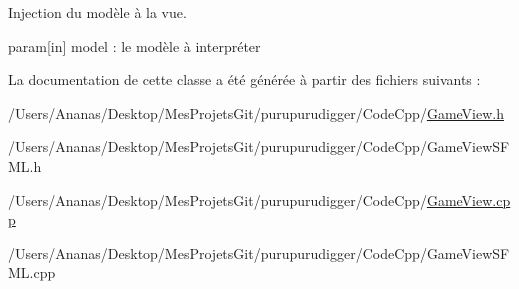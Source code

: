 Injection du modèle à la vue. 

param\mbox{[}in\mbox{]} model \-: le modèle à interpréter 

La documentation de cette classe a été générée à partir des fichiers suivants \-:\begin{DoxyCompactItemize}
\item 
/\-Users/\-Ananas/\-Desktop/\-Mes\-Projets\-Git/purupurudigger/\-Code\-Cpp/\hyperlink{_game_view_8h}{Game\-View.\-h}\item 
/\-Users/\-Ananas/\-Desktop/\-Mes\-Projets\-Git/purupurudigger/\-Code\-Cpp/Game\-View\-S\-F\-M\-L.\-h\item 
/\-Users/\-Ananas/\-Desktop/\-Mes\-Projets\-Git/purupurudigger/\-Code\-Cpp/\hyperlink{_game_view_8cpp}{Game\-View.\-cpp}\item 
/\-Users/\-Ananas/\-Desktop/\-Mes\-Projets\-Git/purupurudigger/\-Code\-Cpp/Game\-View\-S\-F\-M\-L.\-cpp\end{DoxyCompactItemize}
